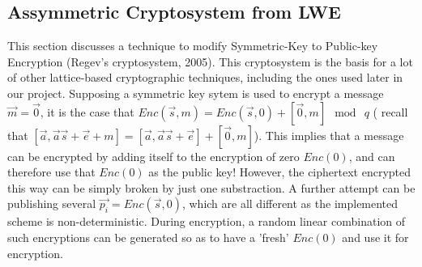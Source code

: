 \subsection{Assymmetric Cryptosystem from LWE}
\label{sec:asymLWE}
This section discusses a technique to modify Symmetric-Key to Public-key
Encryption (Regev's cryptosystem, 2005). This cryptosystem is the basis for a
lot of other lattice-based cryptographic techniques, including the ones used
later in our project. Supposing a symmetric key sytem is used to
encrypt a message $\vec{m} = \vec{0}$, it is the case that
$Enc(\vec{s}, m) = Enc(\vec{s},0) + [\vec{0}, m] \mod \ q$ ( recall that
$[\vec{a}, \vec{a}\vec{s} + \vec{e} + m] = [\vec{a}, \vec{a}\vec{s} + \vec{e}] +
[\vec{0}, m]$). This implies that a message can be encrypted by adding itself to
the encryption of zero $Enc(0)$, and can therefore use that $Enc(0)$ as the
public key! However, the ciphertext encrypted this way can be simply broken by
just one substraction. A further attempt can be publishing several
$\vec{p_i} = Enc(\vec{s}, 0)$, which are all different as the implemented scheme is
non-deterministic. During encryption, a random linear
combination of such encryptions can be generated so as to have a 'fresh' $Enc(0)$ and use it for
encryption.
